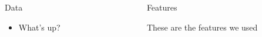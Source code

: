 \documentclass[final]{beamer}
\newlength{\sepwid}
\newlength{\onecolwid}
\newlength{\twocolwid}
\begin{document}
\begin{frame}[t]
\begin{columns}[t]
\begin{column}{\onecolwid}

\begin{block}{Data}

\begin{itemize}

  \item What's up?

\end{itemize}

\end{block}

\end{column} %



\begin{column}{\sepwid}\end{column} %

\begin{column}{\twocolwid} %

\begin{columns}[t,totalwidth=\twocolwid] %

\begin{column}{\onecolwid}\vspace{-.6in} %


\begin{block}{Features}

  These are the features we used 

\end{block}


\end{column} %

\begin{column}{\onecolwid}\vspace{-.6in} %


\end{column}
\end{columns}
\end{column}
\end{columns}
\end{frame}
\end{document}
